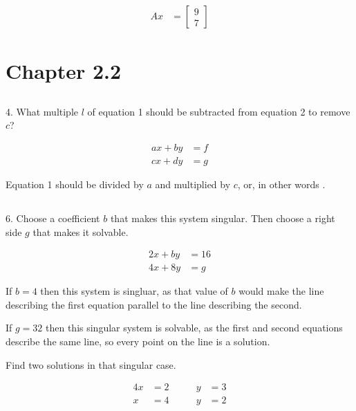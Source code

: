 \documentclass[paper=a4, fontsize=10pt]{scrartcl} %
\begin{document}
	\begin{align}
		Ax &= \begin{bmatrix}
			9 \\ 7
		\end{bmatrix}
	\end{align}


\section*{Chapter 2.2}

\subsection*{}
\setcounter{equation}{0}
4. What multiple $l$ of equation 1 should be subtracted from equation 2 to remove $c$?

	\begin{align}
		ax + by &= f \\
		cx + dy &= g
	\end{align}

	Equation 1 should be divided by $a$ and multiplied by $c$, or, in other words .

\subsection*{}
\setcounter{equation}{0}

6. Choose a coefficient $b$ that makes this system singular. Then choose a right side $g$ that makes it solvable.

	\begin{align*}
		2x + by &= 16 \\
		4x + 8y &= g
	\end{align*}

	If $b = 4$ then this system is singluar, as that value of $b$ would make the line describing the first equation parallel to the line describing the second.

	If $g = 32$ then this singular system is solvable, as the first and second equations describe the same line, so every point on the line is a solution.

Find two solutions in that singular case.

	\begin{alignat}{4}
		x &= 2 &\qquad y &= 3 \\
		x &= 4 &\qquad y &= 2
	\end{alignat}
\end{document}
